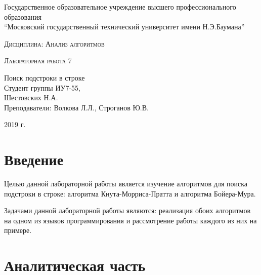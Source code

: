 \documentclass[a4paper, 14pt]{article}
\begin{document}
    \begin{titlepage}

        \begin{center}
            \large
            Государственное образовательное учреждение высшего профессионального образования\\
            “Московский государственный технический университет имени Н.Э.Баумана”
            \vspace{3cm}
            
            \textsc{Дисциплина: Анализ алгоритмов}
            \vspace{0.5cm}
                
            \textsc{Лабораторная работа 7}
            \vspace{1.5cm}
            
            {\LARGE Поиск подстроки в строке\\}
            \vspace{1.5cm}
            Студент группы ИУ7-55,\\   
            Шестовских Н.А.\\
            Преподаватели: Волкова Л.Л., Строганов Ю.В.
            \vfill
            
            2019 г.
            
            \end{center}

    \end{titlepage}
    \setcounter{page}{2}
\tableofcontents
	
	\newpage
	
        \section*{Введение}
        
        
        \parindent=1cm
        
        
        Целью данной лабораторной работы является изучение алгоритмов для поиска подстроки в строке: алгоритма Кнута-Морриса-Пратта и алгоритма Бойера-Мура.
        
		Задачами данной лабораторной работы являются: реализация обоих алгоритмов на одном из языков программирования и рассмотрение работы каждого из них на примере.
        \label{sec:intro}

    	\newpage
        \section{Аналитическая часть}
		\parindent=1cm
		
\end{document}
